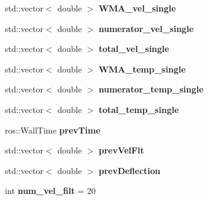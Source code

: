 \begin{DoxyCompactItemize}
\item 
std\+::vector$<$ double $>$ {\bfseries W\+M\+A\+\_\+vel\+\_\+single}\hypertarget{classarmcontroller_a206484d820d2b7e1d6b551743a932509}{}\label{classarmcontroller_a206484d820d2b7e1d6b551743a932509}

\item 
std\+::vector$<$ double $>$ {\bfseries numerator\+\_\+vel\+\_\+single}\hypertarget{classarmcontroller_a9f3263fbca6d767f360eb3b06e36510a}{}\label{classarmcontroller_a9f3263fbca6d767f360eb3b06e36510a}

\item 
std\+::vector$<$ double $>$ {\bfseries total\+\_\+vel\+\_\+single}\hypertarget{classarmcontroller_aa678f9b58952330fe44e2264196cf308}{}\label{classarmcontroller_aa678f9b58952330fe44e2264196cf308}

\item 
std\+::vector$<$ double $>$ {\bfseries W\+M\+A\+\_\+temp\+\_\+single}\hypertarget{classarmcontroller_aabfce7e38904bee74e270344bf42f21d}{}\label{classarmcontroller_aabfce7e38904bee74e270344bf42f21d}

\item 
std\+::vector$<$ double $>$ {\bfseries numerator\+\_\+temp\+\_\+single}\hypertarget{classarmcontroller_a49a3e0ee66d7d79e84be4c90e3d90157}{}\label{classarmcontroller_a49a3e0ee66d7d79e84be4c90e3d90157}

\item 
std\+::vector$<$ double $>$ {\bfseries total\+\_\+temp\+\_\+single}\hypertarget{classarmcontroller_a4a209f5bdc654e6693497f3ba37e4774}{}\label{classarmcontroller_a4a209f5bdc654e6693497f3ba37e4774}

\item 
ros\+::\+Wall\+Time {\bfseries prev\+Time}\hypertarget{classarmcontroller_ad38d99ac9e379ba23eecc4fb27c553ab}{}\label{classarmcontroller_ad38d99ac9e379ba23eecc4fb27c553ab}

\item 
std\+::vector$<$ double $>$ {\bfseries prev\+Vel\+Flt}\hypertarget{classarmcontroller_a77444777c9d52b3f10a0341596f0d9d8}{}\label{classarmcontroller_a77444777c9d52b3f10a0341596f0d9d8}

\item 
std\+::vector$<$ double $>$ {\bfseries prev\+Deflection}\hypertarget{classarmcontroller_a8ee33251dc2ef4e4a2a9f21ca64ee125}{}\label{classarmcontroller_a8ee33251dc2ef4e4a2a9f21ca64ee125}

\item 
int {\bfseries num\+\_\+vel\+\_\+filt} = 20\hypertarget{classarmcontroller_aeaa654264f35cd0c718f256d0d9e4fa0}{}\label{classarmcontroller_aeaa654264f35cd0c718f256d0d9e4fa0}


\end{DoxyCompactItemize}
